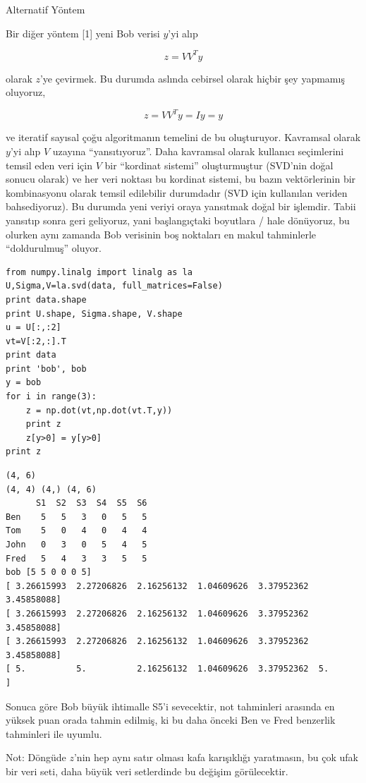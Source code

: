 \documentclass[12pt,fleqn]{article}\usepackage{../../common}
\begin{document}
Alternatif Yöntem

Bir diğer yöntem [1] yeni Bob verisi $y$'yi alıp

$$ z = VV^Ty $$

olarak $z$'ye çevirmek. Bu durumda aslında cebirsel olarak hiçbir şey
yapmamış oluyoruz,

$$ z = VV^Ty = Iy = y$$

ve iteratif sayısal çoğu algoritmanın temelini de bu oluşturuyor. Kavramsal
olarak $y$'yi alıp $V$ uzayına ``yansıtıyoruz''. Daha kavramsal olarak kullanıcı
seçimlerini temsil eden veri için $V$ bir ``kordinat sistemi'' oluşturmuştur
(SVD'nin doğal sonucu olarak) ve her veri noktası bu kordinat sistemi, bu bazın
vektörlerinin bir kombinasyonu olarak temsil edilebilir durumdadır (SVD için
kullanılan veriden bahsediyoruz). Bu durumda yeni veriyi oraya yansıtmak doğal
bir işlemdir. Tabii yansıtıp sonra geri geliyoruz, yani başlangıçtaki boyutlara
/ hale dönüyoruz, bu olurken aynı zamanda Bob verisinin boş noktaları en makul
tahminlerle ``doldurulmuş'' oluyor.

\begin{verbatim}
from numpy.linalg import linalg as la
U,Sigma,V=la.svd(data, full_matrices=False)
print data.shape
print U.shape, Sigma.shape, V.shape
u = U[:,:2]
vt=V[:2,:].T
print data
print 'bob', bob
y = bob
for i in range(3):
    z = np.dot(vt,np.dot(vt.T,y))
    print z
    z[y>0] = y[y>0]
print z
\end{verbatim}

\begin{verbatim}
(4, 6)
(4, 4) (4,) (4, 6)
      S1  S2  S3  S4  S5  S6
Ben    5   5   3   0   5   5
Tom    5   0   4   0   4   4
John   0   3   0   5   4   5
Fred   5   4   3   3   5   5
bob [5 5 0 0 0 5]
[ 3.26615993  2.27206826  2.16256132  1.04609626  3.37952362  3.45858088]
[ 3.26615993  2.27206826  2.16256132  1.04609626  3.37952362  3.45858088]
[ 3.26615993  2.27206826  2.16256132  1.04609626  3.37952362  3.45858088]
[ 5.          5.          2.16256132  1.04609626  3.37952362  5.        ]
\end{verbatim}

Sonuca göre Bob büyük ihtimalle S5'i sevecektir, not tahminleri arasında en
yüksek puan orada tahmin edilmiş, ki bu daha önceki Ben ve Fred benzerlik
tahminleri ile uyumlu. 

Not: Döngüde $z$'nin hep aynı satır olması kafa karışıklığı yaratmasın, bu
çok ufak bir veri seti, daha büyük veri setlerdinde bu değişim
görülecektir. 
\end{document}
